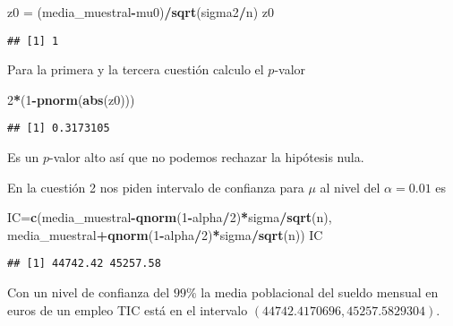 \documentclass[
]{article}
\newenvironment{Shaded}{\begin{snugshade}}{\end{snugshade}}
\newcommand{\DecValTok}[1]{\textcolor[rgb]{0.00,0.00,0.81}{#1}}
\newcommand{\KeywordTok}[1]{\textcolor[rgb]{0.13,0.29,0.53}{\textbf{#1}}}
\newcommand{\NormalTok}[1]{#1}
\newcommand{\OperatorTok}[1]{\textcolor[rgb]{0.81,0.36,0.00}{\textbf{#1}}}
\newcommand{\StringTok}[1]{\textcolor[rgb]{0.31,0.60,0.02}{#1}}
\begin{document}
\begin{Shaded}
\begin{Highlighting}[]
\NormalTok{z0 =}\StringTok{ }\NormalTok{(media_muestral}\OperatorTok{-}\NormalTok{mu0)}\OperatorTok{/}\KeywordTok{sqrt}\NormalTok{(sigma2}\OperatorTok{/}\NormalTok{n)}
\NormalTok{z0}
\end{Highlighting}
\end{Shaded}

\begin{verbatim}
## [1] 1
\end{verbatim}

Para la primera y la tercera cuestión calculo el \(p\)-valor

\begin{Shaded}
\begin{Highlighting}[]
\DecValTok{2}\OperatorTok{*}\NormalTok{(}\DecValTok{1}\OperatorTok{-}\KeywordTok{pnorm}\NormalTok{(}\KeywordTok{abs}\NormalTok{(z0)))}
\end{Highlighting}
\end{Shaded}

\begin{verbatim}
## [1] 0.3173105
\end{verbatim}

Es un \(p\)-valor alto así que no podemos rechazar la hipótesis nula.

En la cuestión 2 nos piden intervalo de confianza para \(\mu\) al nivel
del \(\alpha=0.01\) es

\begin{Shaded}
\begin{Highlighting}[]
\NormalTok{IC=}\KeywordTok{c}\NormalTok{(media_muestral}\OperatorTok{-}\KeywordTok{qnorm}\NormalTok{(}\DecValTok{1}\OperatorTok{-}\NormalTok{alpha}\OperatorTok{/}\DecValTok{2}\NormalTok{)}\OperatorTok{*}\NormalTok{sigma}\OperatorTok{/}\KeywordTok{sqrt}\NormalTok{(n),}
\NormalTok{     media_muestral}\OperatorTok{+}\KeywordTok{qnorm}\NormalTok{(}\DecValTok{1}\OperatorTok{-}\NormalTok{alpha}\OperatorTok{/}\DecValTok{2}\NormalTok{)}\OperatorTok{*}\NormalTok{sigma}\OperatorTok{/}\KeywordTok{sqrt}\NormalTok{(n))}
\NormalTok{IC}
\end{Highlighting}
\end{Shaded}

\begin{verbatim}
## [1] 44742.42 45257.58
\end{verbatim}

Con un nivel de confianza del \(99\%\) la media poblacional del sueldo
mensual en euros de un empleo TIC está en el intervalo
\((44742.4170696, 45257.5829304).\)
\end{document}
